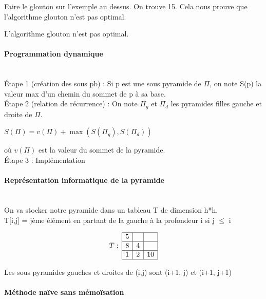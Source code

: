 \begin{com}
	Faire le glouton sur l'exemple au dessus. On trouve 15. Cela nous prouve que l'algorithme glouton n'est pas optimal. 
\end{com}

\begin{rem}
	L'algorithme glouton n'est pas optimal.
\end{rem}

\paragraph{Programmation dynamique}\enspace\\
Étape 1 (création des sous pb) : Si p est une sous pyramide de $\Pi$, on note S(p) la valeur max d'un chemin du sommet de p à sa base. \\
Étape 2 (relation de récurrence) : On note $\Pi_{g}$ et $\Pi_{d}$ les pyramides filles gauche et droite de $\Pi$. \\
\begin{center}$S(\Pi) = v(\Pi) + \max(S(\Pi_{g}), S(\Pi_{d}))$
\end{center}
où $v(\Pi)$ est la valeur du sommet de la pyramide.\\
Étape 3 : Implémentation

\paragraph{Représentation informatique de la pyramide}
\enspace\\
On va stocker notre pyramide dans un tableau T de dimension h*h. \\
T[i,j] = jème élément en partant de la gauche à la profondeur i si j $\leq$ i

$$ T : \: \begin{array}{|c|c|c|}
	\hline
	5 &  &  \\ \hline
	8 & 4 &  \\ \hline
	1 & 2 & 10 \\ \hline
\end{array}
$$

\begin{rem}
	Les sous pyramides gauches et droites de (i,j) sont (i+1, j) et (i+1, j+1)
\end{rem}

\paragraph{Méthode naïve sans mémoïsation} \enspace\\

